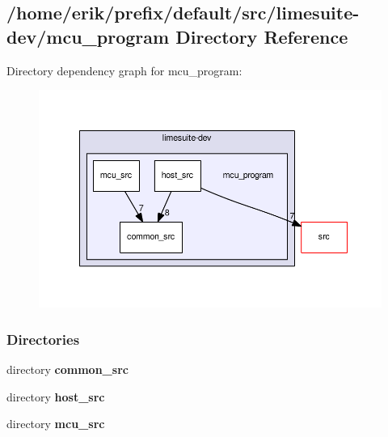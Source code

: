 \subsection{/home/erik/prefix/default/src/limesuite-\/dev/mcu\+\_\+program Directory Reference}
\label{dir_da07ca23790c9a6304e0b9e24d48e880}
Directory dependency graph for mcu\+\_\+program\+:
\nopagebreak
\begin{figure}[H]
\begin{center}
\leavevmode
\includegraphics[width=350pt]{dir_da07ca23790c9a6304e0b9e24d48e880_dep}
\end{center}
\end{figure}
\subsubsection*{Directories}
\begin{DoxyCompactItemize}
\item 
directory {\bf common\+\_\+src}
\item 
directory {\bf host\+\_\+src}
\item 
directory {\bf mcu\+\_\+src}
\end{DoxyCompactItemize}
